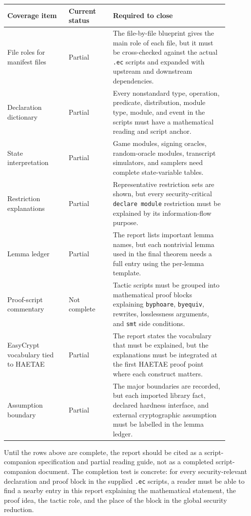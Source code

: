 \documentclass[11pt]{report}
\DeclareRobustCommand{\file}[1]{\ifmmode\text{\nolinkurl{#1}}\else\nolinkurl{#1}\fi}
\DeclareRobustCommand{\ec}[1]{\ifmmode\text{\nolinkurl{#1}}\else\nolinkurl{#1}\fi}
\theoremstyle{definition}
\theoremstyle{plain}
\begin{document}
\begin{longtable}{p{0.25\linewidth}p{0.18\linewidth}p{0.47\linewidth}}
\toprule
\textbf{Coverage item} & \textbf{Current status} & \textbf{Required to close} \\
\midrule
File roles for manifest files & Partial & The file-by-file blueprint gives the
main role of each file, but it must be cross-checked against the actual
\file{.ec} scripts and expanded with upstream and downstream dependencies. \\
Declaration dictionary & Partial & Every nonstandard type, operation,
predicate, distribution, module type, module, and event in the scripts must have
a mathematical reading and script anchor. \\
State interpretation & Partial & Game modules, signing oracles, random-oracle
modules, transcript simulators, and samplers need complete state-variable
tables. \\
Restriction explanations & Partial & Representative restriction sets are
shown, but every security-critical \ec{declare module} restriction must be
explained by its information-flow purpose. \\
Lemma ledger & Partial & The report lists important lemma names, but each
nontrivial lemma used in the final theorem needs a full entry using the
per-lemma template. \\
Proof-script commentary & Not complete & Tactic scripts must be grouped into
mathematical proof blocks explaining \ec{byphoare}, \ec{byequiv}, rewrites,
losslessness arguments, and \ec{smt} side conditions. \\
EasyCrypt vocabulary tied to HAETAE & Partial & The report states the vocabulary
that must be explained, but the explanations must be integrated at the first
HAETAE proof point where each construct matters. \\
Assumption boundary & Partial & The major boundaries are recorded, but each
imported library fact, declared hardness interface, and external cryptographic
assumption must be labelled in the lemma ledger. \\
\bottomrule
\end{longtable}

Until the rows above are complete, the report should be cited as a
script-companion specification and partial reading guide, not as a completed
script-companion document.  The completion test is concrete: for every
security-relevant declaration and proof block in the supplied \file{.ec}
scripts, a reader must be able to find a nearby entry in this report explaining
the mathematical statement, the proof idea, the tactic role, and the place of
the block in the global security reduction.
\end{document}
